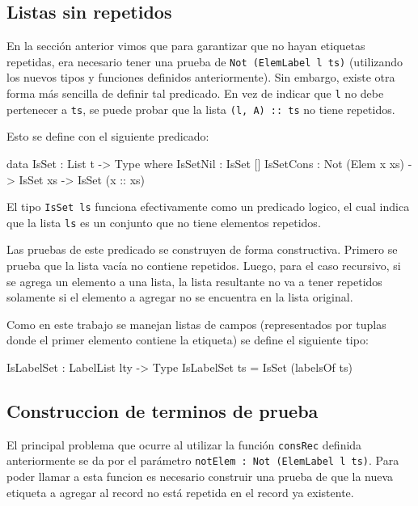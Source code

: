 \subsection{Listas sin repetidos}

En la sección anterior vimos que para garantizar que no hayan etiquetas repetidas, era necesario tener una prueba de \texttt{Not (ElemLabel l ts)} (utilizando los nuevos tipos y funciones definidos anteriormente). Sin embargo, existe otra forma más sencilla de definir tal predicado. En vez de indicar que \texttt{l} no debe pertenecer a \texttt{ts}, se puede probar que la lista \texttt{(l, A) :: ts} no tiene repetidos.

Esto se define con el siguiente predicado:

\begin{code}
data IsSet : List t -> Type where
  IsSetNil : IsSet []
  IsSetCons : Not (Elem x xs) -> IsSet xs -> 
    IsSet (x :: xs)
\end{code}

El tipo \texttt{IsSet ls} funciona efectivamente como un predicado logico, el cual indica que la lista \texttt{ls} es un conjunto que no tiene elementos repetidos.

Las pruebas de este predicado se construyen de forma constructiva. Primero se prueba que la lista vacía no contiene repetidos. Luego, para el caso recursivo, si se agrega un elemento a una lista, la lista resultante no va a tener repetidos solamente si el elemento a agregar no se encuentra en la lista original.

Como en este trabajo se manejan listas de campos (representados por tuplas donde el primer elemento contiene la etiqueta) se define el siguiente tipo:

\begin{code}
IsLabelSet : LabelList lty -> Type
IsLabelSet ts = IsSet (labelsOf ts)  
\end{code}

\subsection{Construccion de terminos de prueba}

El principal problema que ocurre al utilizar la función \texttt{consRec} definida anteriormente se da por el parámetro \texttt{notElem : Not (ElemLabel l ts)}. Para poder llamar a esta funcion es necesario construir una prueba de que la nueva etiqueta a agregar al record no está repetida en el record ya existente.

